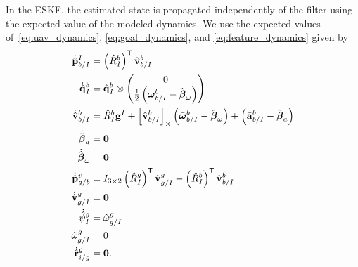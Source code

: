 In the ESKF, the estimated state is propagated independently of the filter using
the expected value of the modeled dynamics. We use the expected values
of~\eqref{eq:uav_dynamics}, \eqref{eq:goal_dynamics}, and
\eqref{eq:feature_dynamics} given by
\begin{align}
  \dot{\hat{\boldsymbol{\mathrm{p}}}}_{b/I}^I
  &=
  \left( \hat{R}_I^b \right)^{\mathsf{T}} \hat{\boldsymbol{\mathrm{v}}}_{b/I}^b
  \label{eq:estimated_dynamics}
  \\
  \dot{\hat{\boldsymbol{\mathrm{q}}}}_{I}^{b} 
  &= 	
  \hat{\boldsymbol{\mathrm{q}}}_I^b \otimes \begin{pmatrix} 0 \\ \frac{1}{2}
  \left( \bar{\boldsymbol{\mathrm{\omega}}}_{b/I}^b - \hat{\boldsymbol{\mathrm{\beta}}}_\omega \right)
\end{pmatrix} \nonumber \\
  \dot{\hat{\boldsymbol{\mathrm{v}}}}_{b/I}^b 
  &=
  \hat{R}_I^b \boldsymbol{\mathrm{g}}^I
  +
  \left[ \hat{\boldsymbol{\mathrm{v}}}_{b/I}^b \right]_{\times}
  \left( \bar{\boldsymbol{\mathrm{\omega}}}_{b/I}^b - \hat{\boldsymbol{\mathrm{\beta}}}_\omega \right)
  +
  \left( \bar{\boldsymbol{\mathrm{a}}}_{b/I}^b - \hat{\boldsymbol{\mathrm{\beta}}}_a \right) \nonumber
  \\
  \dot{\hat{\boldsymbol{\mathrm{\beta}}}}_a &= \boldsymbol{\mathrm{0}} \nonumber
  \\
  \dot{\hat{\boldsymbol{\mathrm{\beta}}}}_\omega &= \boldsymbol{\mathrm{0}} \nonumber
  \\
  \dot{\hat{\boldsymbol{\mathrm{p}}}}_{g/b}^{v} &= I_{3 \times 2} \left( \hat{R}_{I}^{g} \right)^{\mathsf{T}}
   \hat{\boldsymbol{\mathrm{v}}}_{g/I}^{g} - \left( \hat{R}_{I}^{b} \right)^{\mathsf{T}}
  \hat{\boldsymbol{\mathrm{v}}}_{b/I}^{b} \nonumber \\
  \dot{\hat{\boldsymbol{\mathrm{v}}}}_{g/I}^{g} &= \boldsymbol{\mathrm{0}} \nonumber \\
  \dot{\hat{\psi}}_{I}^{g} &= \hat{\omega}_{g/I}^g \nonumber \\
  \dot{\hat{\omega}}_{g/I}^{g} &= 0 \nonumber \\
  \dot{\hat{\boldsymbol{\mathrm{r}}}}_{i/g}^g &= \boldsymbol{\mathrm{0}}. \nonumber
\end{align}

